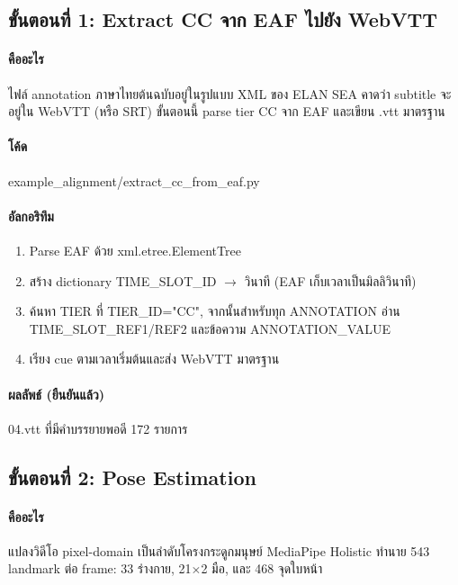 \documentclass[11pt,a4paper]{article}
\def\texttt#1{#1}%
\def\textbf#1{#1}%
\begin{document}
\subsection{ขั้นตอนที่ 1: Extract CC จาก EAF ไปยัง WebVTT}
\label{sec:step1}

\paragraph{คืออะไร}
ไฟล์ annotation ภาษาไทยต้นฉบับอยู่ในรูปแบบ XML ของ ELAN
SEA คาดว่า subtitle จะอยู่ใน WebVTT (หรือ SRT)
ขั้นตอนนี้ parse tier \texttt{CC} จาก EAF และเขียน \texttt{.vtt} มาตรฐาน

\paragraph{โค้ด} \texttt{example\_alignment/extract\_cc\_from\_eaf.py}

\paragraph{อัลกอริทึม}
\begin{enumerate}[leftmargin=1.5em]
  \item Parse EAF ด้วย \texttt{xml.etree.ElementTree}
  \item สร้าง dictionary \texttt{TIME\_SLOT\_ID $\to$ วินาที}
        (EAF เก็บเวลาเป็นมิลลิวินาที)
  \item ค้นหา \texttt{TIER} ที่ \texttt{TIER\_ID="CC"},
        จากนั้นสำหรับทุก \texttt{ANNOTATION} อ่าน \texttt{TIME\_SLOT\_REF1/REF2}
        และข้อความ \texttt{ANNOTATION\_VALUE}
  \item เรียง cue ตามเวลาเริ่มต้นและส่ง WebVTT มาตรฐาน
\end{enumerate}

\paragraph{ผลลัพธ์ (ยืนยันแล้ว)} \texttt{04.vtt} ที่มีคำบรรยายพอดี \textbf{172} รายการ


\subsection{ขั้นตอนที่ 2: Pose Estimation}
\label{sec:step2}

\paragraph{คืออะไร}
แปลงวิดีโอ pixel-domain เป็นลำดับโครงกระดูกมนุษย์
MediaPipe Holistic ทำนาย 543 landmark ต่อ frame:
33 ร่างกาย, 21$\times$2 มือ, และ 468 จุดใบหน้า
\end{document}

